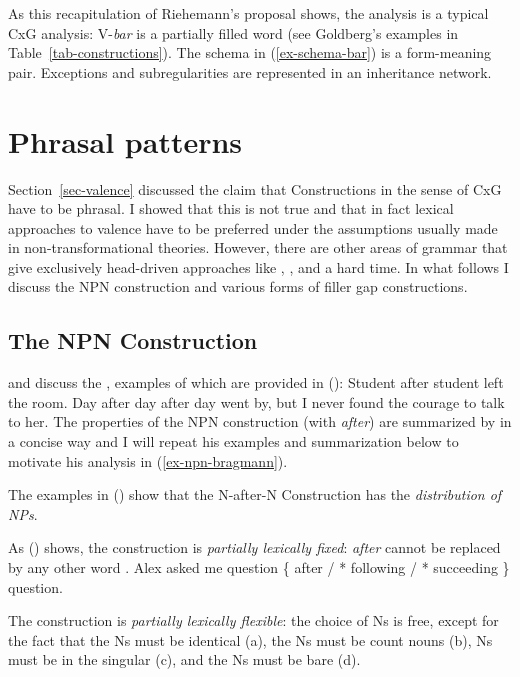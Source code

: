 \documentclass[output=paper
	        ,collection
	        ,collectionchapter
 	        ,biblatex
                ,babelshorthands
                ,newtxmath
                ,draftmode
                ,colorlinks, citecolor=brown
]{langscibook}
\begin{document}
As this recapitulation of Riehemann's proposal shows, the analysis is a typical CxG analysis:
V-\emph{bar} is a partially filled word (see Goldberg's examples in
Table~\ref{tab-constructions}). The schema in (\ref{ex-schema-bar}) is a form-meaning
pair. Exceptions and subregularities are represented in an inheritance network.

\section{Phrasal patterns}
\label{sec-phrasal-patterns}
\label{sec-phrasal}

Section~\ref{sec-valence} discussed the claim that Constructions in the sense of CxG have to be phrasal. I
showed that this is not true and that in fact lexical approaches to valence have to be preferred
under the assumptions usually made in non-transformational theories. However, there are other areas
of grammar that give exclusively head-driven approaches like \cg, \minimalism, and \dg a hard
time. In what follows I discuss the NPN construction and various forms of filler gap constructions.

\subsection{The NPN Construction}
\label{sec-npn}

\citet{Matsuyama2004a} and \citet{Jackendoff2008a} discuss the , examples
of
which are provided in ():
\eal
\ex Student after student left the room.
\ex
\label{ex-npn-iteration}
Day after day after day went by, but I never found the courage to talk to
her. \citep{Bargmann2015a}
\zl
The properties of the NPN construction (with \emph{after})  are summarized by \citet{Bargmann2015a}
in a concise way and I will repeat his examples and summarization below to motivate his analysis in (\ref{ex-npn-bragmann}).

The examples in () show that the N-after-N Construction has the \emph{distribution of NPs}.

As () shows, the construction is \emph{partially lexically fixed}: \emph{after} cannot be
replaced by any other word \citep[]{Matsuyama2004a}.
\ea
Alex asked me question \{ after / * following / * succeeding \} question.
\z

The construction is \emph{partially lexically flexible}: the choice of Ns is free, except for the fact that
the Ns must be identical (a), the Ns must be count nouns (b), Ns must be in the
singular (c), and the Ns must be bare (d).
\end{document}
